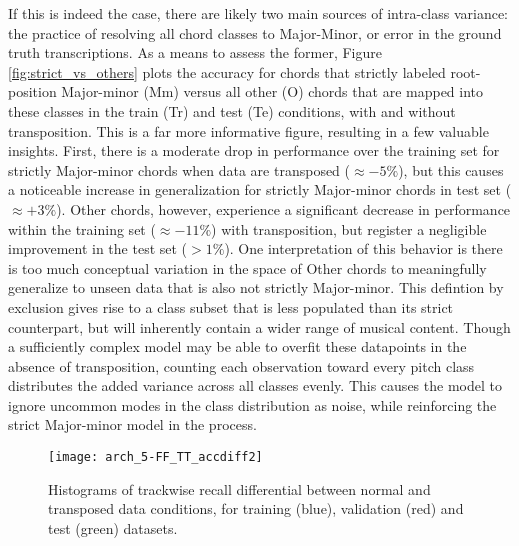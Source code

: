 If this is indeed the case, there are likely two main sources of intra-class variance: the practice of resolving all chord classes to Major-Minor, or error in the ground truth transcriptions.
As a means to assess the former, Figure \ref{fig:strict_vs_others} plots the accuracy for chords that strictly labeled root-position Major-minor (Mm) versus all other (O) chords that are mapped into these classes in the train (Tr) and test (Te) conditions, with and without transposition.
This is a far more informative figure, resulting in a few valuable insights.
First, there is a moderate drop in performance over the training set for strictly Major-minor chords when data are transposed ($\approx -5\%$), but this causes a noticeable increase in generalization for strictly Major-minor chords in test set ($\approx +3\%$).
Other chords, however, experience a significant decrease in performance within the training set ($\approx -11\%$) with transposition, but register a negligible improvement in the test set ($>1\%$).
One interpretation of this behavior is there is too much conceptual variation in the space of Other chords to meaningfully generalize to unseen data that is also not strictly Major-minor.
This defintion by exclusion gives rise to a class subset that is less populated than its strict counterpart, but will inherently contain a wider range of musical content.
Though a sufficiently complex model may be able to overfit these datapoints in the absence of transposition, counting each observation toward every pitch class distributes the added variance across all classes evenly.
This causes the model to ignore uncommon modes in the class distribution as noise, while reinforcing the strict Major-minor model in the process.


\begin{figure}[!t]
\centering
\texttt{[image: arch\_5-FF\_TT\_accdiff2]}
\caption{Histograms of trackwise recall differential between normal and transposed data conditions, for training (blue), validation (red) and test (green) datasets.}
\label{fig:acc_diff}
\end{figure}

